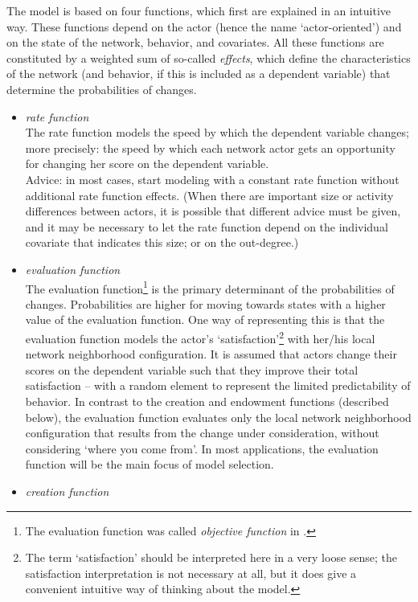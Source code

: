 \documentclass[a4paper,fleqn,11pt]{article}
\newcommand{\+}{\, + \,}
\begin{document}
{The model is based on four functions, which first are explained in an
intuitive way.
These functions depend on the actor (hence the name `actor-oriented')
and on the state of the network, behavior, and covariates.
All these functions are constituted by a weighted sum
of so-called \emph{effects}, which define the characteristics of
the network (and behavior, if this is included as a dependent variable)
that determine the probabilities of changes.


\begin{itemize}
\item \emph{rate function}\\
The rate function models the speed by which the dependent variable
changes; more precisely: the speed by which each network actor
gets an opportunity for changing her score on the dependent
variable.\\
Advice: in most cases, start modeling with a constant rate function without
additional rate function effects.
(When there are important size or activity differences between
actors, it is possible that different advice must be given,
and it may be necessary to let the rate function
depend on the individual covariate that indicates this size;
or on the out-degree.)
\item {\em evaluation function }\\
The evaluation function\footnote{The evaluation function was called
\emph{objective function} in \citet{Snijders01}.}
is the primary determinant of the probabilities of changes.
Probabilities are higher for moving towards states with a higher value
of the evaluation function.
One way of representing this is that the evaluation function
models the actor's `satisfaction'\footnote{The term
`satisfaction' should be interpreted here in a very loose sense;
the satisfaction interpretation is not necessary at all, but it does give
a convenient intuitive way of thinking about the model.}
with her/his local
network neighborhood configuration. It is assumed that actors
change their scores on the dependent variable such that they
improve their total satisfaction -- with a random element
to represent the limited predictability of behavior.
In contrast to the creation and endowment
functions (described below), the evaluation function evaluates only
the local network neighborhood configuration that results from the
change under consideration, without considering `where you come from'.
In most applications, the evaluation function will
be the main focus of model selection.\\
\item {\em creation function }\\

\end{itemize}}
\end{document}
